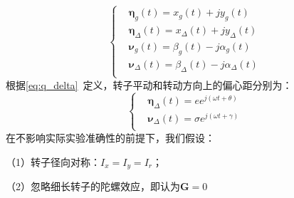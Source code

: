 \documentclass[
  lang=cn,
  degree=master,
  openany,oneside
]{nuaathesis}
\begin{document}
\begin{equation}
\label{eq:decouple_define}
\left\{
\begin{aligned}
& \boldsymbol{\eta} _g(t) = x_g(t) + jy_g(t)\\
& \boldsymbol{\eta} _{\Delta}(t) = x_{\Delta}(t) + jy_{\Delta}(t)\\
& \boldsymbol{\nu} _g(t) = {\beta}_g(t) - j{\alpha}_g(t)\\
& \boldsymbol{\nu} _{\Delta}(t) = {\beta}_{\Delta}(t) - j{\alpha}_{\Delta}(t)\\
\end{aligned}
\right.
\end{equation}
根据\autoref{eq:q_delta}~定义，转子平动和转动方向上的偏心距分别为：
\begin{equation}
\label{eq:eta_nu_define}
\left\{
\begin{aligned}
&\boldsymbol{\eta} _{\Delta}(t) = ee^{j(\omega t + \theta)} \\
&\boldsymbol{\nu} _{\Delta}(t) = \sigma e^{j(\omega t + \gamma)} \\
\end{aligned}
\right.
\end{equation}
在不影响实际实验准确性的前提下，我们假设：

（1）转子径向对称：$I_x = I_y = I_r$；

（2）忽略细长转子的陀螺效应，即认为$\boldsymbol{G} = 0$
\end{document}
